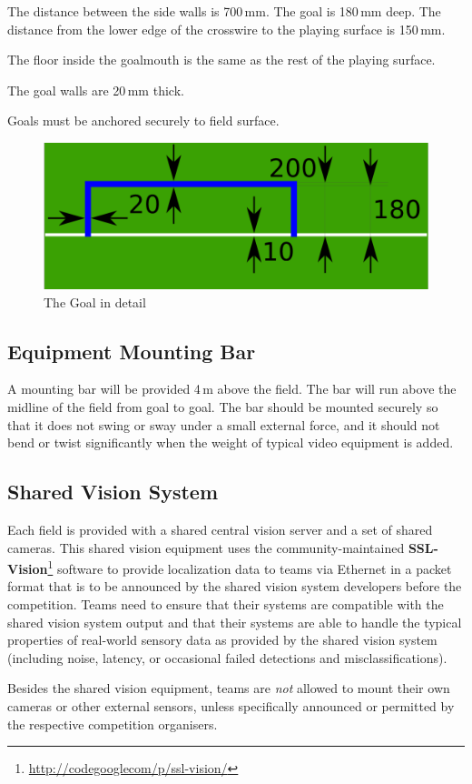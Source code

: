 The distance between the side walls is 700\,mm.
The goal is 180\,mm deep.
The distance from the lower edge of the crosswire to the playing surface is 150\,mm.

The floor inside the goalmouth is the same as the rest of the playing surface.

The goal walls are 20\,mm thick.

Goals must be anchored securely to field surface.

\begin{figure}[ht] %
	\centering
	\includegraphics[width=0.5\columnwidth]{img/goal_detail.png}
	\caption{The Goal in detail}
	\label{fig:sslgoal}
\end{figure}

\subsection{Equipment Mounting Bar}
A mounting bar will be provided 4\,m above the field.
The bar will run above the midline of the field from goal to goal.
The bar should be mounted securely so that it does not swing or sway under a small external force, and it should not bend or twist significantly when the weight of typical video equipment is added.

\subsection{Shared Vision System}
Each field is provided with a shared central vision server and a set of shared cameras.
This shared vision equipment uses the community-maintained \textbf{SSL-Vision}\footnote{\url{http://codegooglecom/p/ssl-vision/}} software to provide localization data to teams via Ethernet in a packet format that is to be announced by the shared vision system developers before the competition.
Teams need to ensure that their systems are compatible with the shared vision system output and that their systems are able to handle the typical properties of real-world sensory data as provided by the shared vision system (including noise, latency, or occasional failed detections and misclassifications).

Besides the shared vision equipment, teams are \emph{not} allowed to mount their own cameras or other external sensors, unless specifically announced or permitted by the respective competition organisers.

